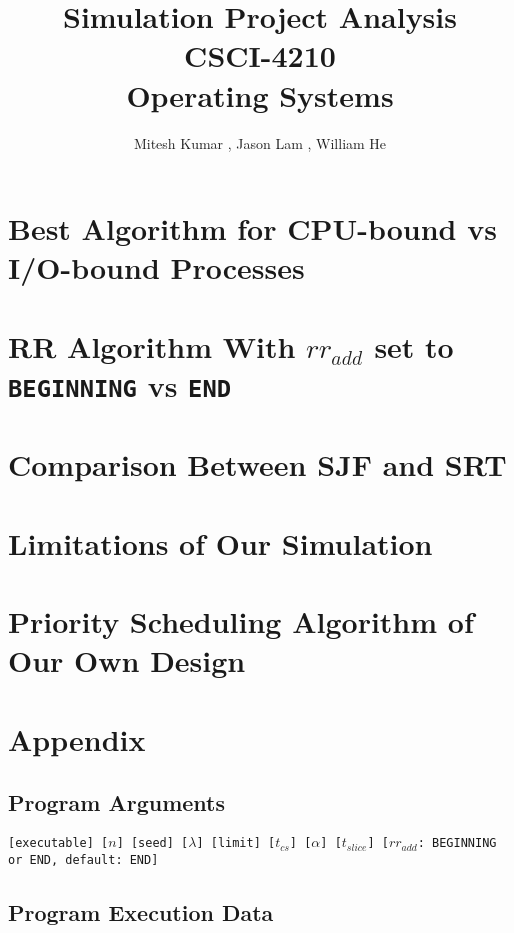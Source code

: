 \documentclass{article}
\title{\textbf{Simulation Project Analysis} \\ 
       \textbf{CSCI-4210} \\ 
       \textbf{Operating Systems}}
\author{Mitesh Kumar {\tt <kumarm4>}, Jason Lam {\tt <lamj7>}, William He {\tt <hew7>}}
\begin{document}
\maketitle

\section{Best Algorithm for CPU-bound vs I/O-bound Processes}
\section{RR Algorithm With {\tt $rr_{add}$} set to {\tt BEGINNING} vs {\tt END}}
\section{Comparison Between SJF and SRT}
\section{Limitations of Our Simulation}
\section{Priority Scheduling Algorithm of Our Own Design}
\section{Appendix}
\subsection*{Program Arguments}
{\tt[executable] [$n$] [seed] [$\lambda$] [limit] [$t_{cs}$] [$\alpha$] [$t_{slice}$] [$rr_{add}$: BEGINNING or END, default: END]}

\subsection*{Program Execution Data}
\end{document}
